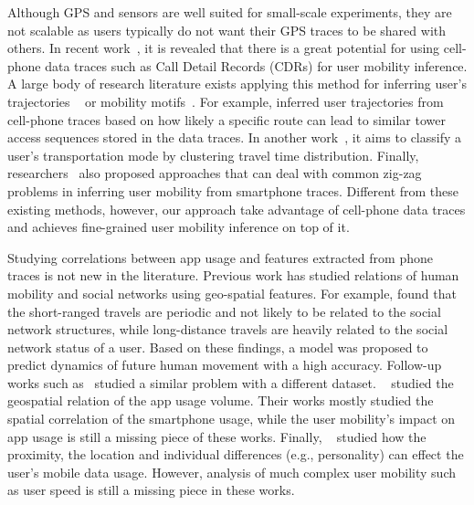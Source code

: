 Although GPS and sensors are well suited for small-scale experiments, they are not scalable as users typically do not want their GPS traces to be shared with others. In recent work~\cite{rose2006mobile},  it is revealed that there is a great potential for using cell-phone data traces such as Call Detail Records (CDRs) for user mobility inference. A large body of research literature exists applying this method for inferring user's trajectories ~\cite{smoreda2013spatiotemporal, hoteit2014estimating, widhalm2015discovering, Alsolami2012Auth, jiang2013review, bekhor2015investigation} or mobility motifs~\cite{wang2014mobile, gambs2012next}. For example, \cite{Alsolami2012Auth, jiang2013review} inferred user trajectories from cell-phone traces based on how likely a specific route can lead to similar tower access sequences stored in the data traces. In another work~\cite{wang2010transportation}, it aims to classify a user's transportation mode by clustering travel time distribution. Finally, researchers~\cite{bekhor2015investigation} also proposed approaches that can deal with common zig-zag problems in inferring user mobility from smartphone traces.
Different from these existing methods, however, our approach take advantage of cell-phone data traces and achieves fine-grained user mobility inference on top of it.


Studying correlations between app usage and features extracted from phone traces is not new in the literature. Previous work has studied relations of human mobility and social networks using geo-spatial features. For example, \cite{cho2011friendship} found that the short-ranged travels are periodic and not likely to be related to the social network structures, while long-distance travels are heavily related to the social network status of a user. Based on these findings, a model was proposed to predict dynamics of future human movement with a high accuracy. Follow-up works such as~\cite{Noulas11} studied a similar problem with a different dataset. ~\cite{shafiq2012characterizing,yang2015characterizing} studied the geospatial relation of the app usage volume. Their works mostly studied the spatial correlation of the smartphone usage, while the user mobility's impact on app usage is still a missing piece of these works. Finally, ~\cite{meng2014analyzing} studied how the proximity, the location and individual differences (e.g., personality) can effect the user's mobile data usage. However, analysis of much complex user mobility such as user speed is still a missing piece in these works.

